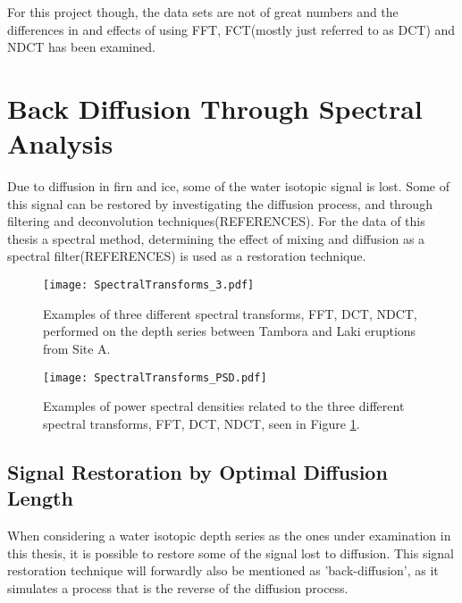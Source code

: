 \documentclass[../../CompleteThesis2/Complete_2ndDraft]{subfiles}
\begin{document}
For this project though, the data sets are not of great numbers and the differences in and effects of using FFT, FCT(mostly just referred to as DCT) and NDCT has been examined.


\section[Back Diffusion][Back Diffusion]{Back Diffusion Through Spectral Analysis}
\label{Sec:SignalAnalysis_BackDiffusion}
Due to diffusion in firn and ice, some of the water isotopic signal is lost. Some of this signal can be restored by investigating the diffusion process, and through filtering and deconvolution techniques(REFERENCES).
For the data of this thesis a spectral method, determining the effect of mixing and diffusion as a spectral filter(REFERENCES) is used as a restoration technique. 
	
	
	


\begin{figure}[h]
	\centering
	\texttt{[image: SpectralTransforms\_3.pdf]}
	\caption[FFT, DCT, NDCT, Site A]{\small Examples of three different spectral transforms, FFT, DCT, NDCT, performed on the depth series between Tambora and Laki eruptions from Site A.}
	\label{fig:SpectralTransforms_3}
\end{figure}

\begin{figure}[h]
	\centering
	\texttt{[image: SpectralTransforms\_PSD.pdf]}
	\caption[FFT, DCT, NDCT PSDs, Site A]{\small Examples of power spectral densities related to the three different spectral transforms, FFT, DCT, NDCT, seen in Figure \ref{fig:SpectralTransforms_3}.}
	\label{fig:SpectralTransforms_PSD}
\end{figure}







\subsection[Signal Restoration][Signal Restoration]{Signal Restoration by Optimal Diffusion Length}
\label{Subsec:SignalAnalysis_BackDiffusion_SignalRestoration}
When considering a water isotopic depth series as the ones under examination in this thesis, it is possible to restore some of the signal lost to diffusion. This signal restoration technique will forwardly also be mentioned as 'back-diffusion', as it simulates a process that is the reverse of the diffusion process.
\end{document}
